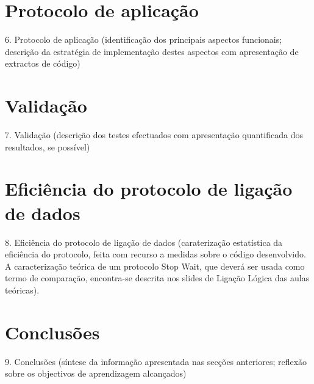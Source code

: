 \documentclass[article, a4paper, 11pt, oneside]{memoir}
\begin{document}
\chapter[Protocolo de aplicação][Protocolo de aplicação]{Protocolo de aplicação} \label{\thechapter}
  
6. Protocolo de aplicação
  (identificação dos principais aspectos funcionais; descrição da estratégia de implementação destes aspectos com apresentação de extractos de código)

\newpage
\chapter[Validação][Validação]{Validação} \label{\thechapter}

7. Validação
  (descrição dos testes efectuados com apresentação quantificada dos resultados, se possível)

\newpage
\chapter[Eficiência do protocolo de ligação de dados][Eficiência do protocolo de ligação de dados]{Eficiência do protocolo de ligação de dados} \label{\thechapter}

8. Eficiência do protocolo de ligação de dados (caraterização estatística da  eficiência do protocolo, feita com recurso a medidas sobre o código desenvolvido. 
A caracterização teórica de um protocolo Stop Wait, que 
   deverá ser usada como termo de comparação, encontra-se descrita nos slides de Ligação Lógica das aulas teóricas).

\newpage
\chapter[Conclusões][Conclusões]{Conclusões} \label{\thechapter}

9. Conclusões
  (síntese da informação apresentada nas secções anteriores; reflexão sobre os objectivos de aprendizagem alcançados)
\end{document}
